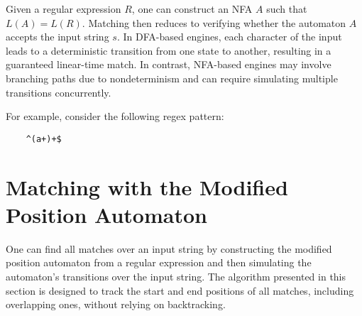 Given a regular expression $R$, one can construct an NFA $A$ such that $L(A) = L(R)$. Matching then reduces to verifying whether the automaton $A$ accepts the input string $s$. In DFA-based engines, each character of the input leads to a deterministic transition from one state to another, resulting in a guaranteed linear-time match. In contrast, NFA-based engines may involve branching paths due to nondeterminism and can require simulating multiple transitions concurrently.



For example, consider the following regex pattern:
\begin{verbatim}
	^(a+)+$
\end{verbatim}

\section {Matching with the Modified Position Automaton}
One can find all matches over an input string by constructing the modified position automaton from a regular expression and then simulating the automaton's transitions over the input string. The algorithm presented in this section is designed to track the start and end positions of all matches, including overlapping ones, without relying on backtracking.


